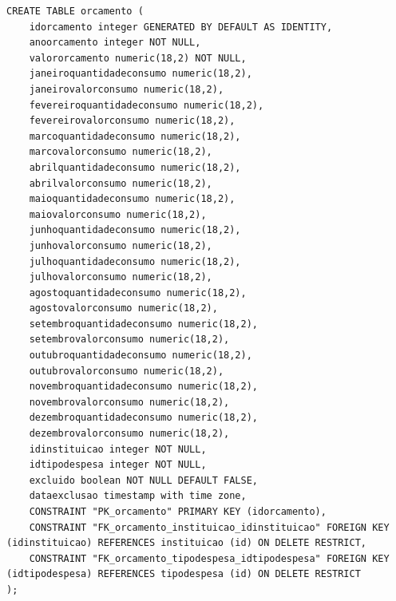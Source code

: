 \begin{quadro}[H]
\caption{Script SQL — Tabela orcamento}
\label{qua:script-orcamento}
\begin{minipage}{0.96\textwidth}
\begin{lstlisting}[style=academic-sql]
CREATE TABLE orcamento (
    idorcamento integer GENERATED BY DEFAULT AS IDENTITY,
    anoorcamento integer NOT NULL,
    valororcamento numeric(18,2) NOT NULL,
    janeiroquantidadeconsumo numeric(18,2),
    janeirovalorconsumo numeric(18,2),
    fevereiroquantidadeconsumo numeric(18,2),
    fevereirovalorconsumo numeric(18,2),
    marcoquantidadeconsumo numeric(18,2),
    marcovalorconsumo numeric(18,2),
    abrilquantidadeconsumo numeric(18,2),
    abrilvalorconsumo numeric(18,2),
    maioquantidadeconsumo numeric(18,2),
    maiovalorconsumo numeric(18,2),
    junhoquantidadeconsumo numeric(18,2),
    junhovalorconsumo numeric(18,2),
    julhoquantidadeconsumo numeric(18,2),
    julhovalorconsumo numeric(18,2),
    agostoquantidadeconsumo numeric(18,2),
    agostovalorconsumo numeric(18,2),
    setembroquantidadeconsumo numeric(18,2),
    setembrovalorconsumo numeric(18,2),
    outubroquantidadeconsumo numeric(18,2),
    outubrovalorconsumo numeric(18,2),
    novembroquantidadeconsumo numeric(18,2),
    novembrovalorconsumo numeric(18,2),
    dezembroquantidadeconsumo numeric(18,2),
    dezembrovalorconsumo numeric(18,2),
    idinstituicao integer NOT NULL,
    idtipodespesa integer NOT NULL,
    excluido boolean NOT NULL DEFAULT FALSE,
    dataexclusao timestamp with time zone,
    CONSTRAINT "PK_orcamento" PRIMARY KEY (idorcamento),
    CONSTRAINT "FK_orcamento_instituicao_idinstituicao" FOREIGN KEY (idinstituicao) REFERENCES instituicao (id) ON DELETE RESTRICT,
    CONSTRAINT "FK_orcamento_tipodespesa_idtipodespesa" FOREIGN KEY (idtipodespesa) REFERENCES tipodespesa (id) ON DELETE RESTRICT
);
\end{lstlisting}
\end{minipage}
\end{quadro}

